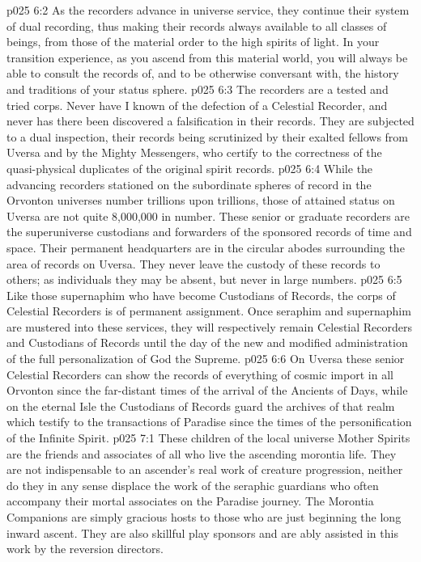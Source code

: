 \vs p025 6:2 As the recorders advance in universe service, they continue their system of dual recording, thus making their records always available to all classes of beings, from those of the material order to the high spirits of light. In your transition experience, as you ascend from this material world, you will always be able to consult the records of, and to be otherwise conversant with, the history and traditions of your status sphere.
\vs p025 6:3 The recorders are a tested and tried corps. Never have I known of the defection of a Celestial Recorder, and never has there been discovered a falsification in their records. They are subjected to a dual inspection, their records being scrutinized by their exalted fellows from Uversa and by the Mighty Messengers, who certify to the correctness of the quasi\hyp{}physical duplicates of the original spirit records.
\vs p025 6:4 While the advancing recorders stationed on the subordinate spheres of record in the Orvonton universes number trillions upon trillions, those of attained status on Uversa are not quite 8,000,000 in number. These senior or graduate recorders are the superuniverse custodians and forwarders of the sponsored records of time and space. Their permanent headquarters are in the circular abodes surrounding the area of records on Uversa. They never leave the custody of these records to others; as individuals they may be absent, but never in large numbers.
\vs p025 6:5 Like those supernaphim who have become Custodians of Records, the corps of Celestial Recorders is of permanent assignment. Once seraphim and supernaphim are mustered into these services, they will respectively remain Celestial Recorders and Custodians of Records until the day of the new and modified administration of the full personalization of God the Supreme.
\vs p025 6:6 On Uversa these senior Celestial Recorders can show the records of everything of cosmic import in all Orvonton since the far\hyp{}distant times of the arrival of the Ancients of Days, while on the eternal Isle the Custodians of Records guard the archives of that realm which testify to the transactions of Paradise since the times of the personification of the Infinite Spirit.
\vs p025 7:1 These children of the local universe Mother Spirits are the friends and associates of all who live the ascending morontia life. They are not indispensable to an ascender’s real work of creature progression, neither do they in any sense displace the work of the seraphic guardians who often accompany their mortal associates on the Paradise journey. The Morontia Companions are simply gracious hosts to those who are just beginning the long inward ascent. They are also skillful play sponsors and are ably assisted in this work by the reversion directors.
